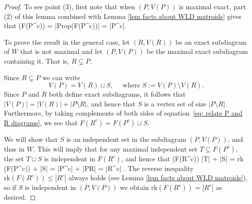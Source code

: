 \documentclass[11pt]{article}
\newcommand{\rk}{\textrm{rk} }
\def\ba #1\ea{\begin{align} #1 \end{align}}
\def\bas #1\eas{\begin{align*} #1 \end{align*}}
\newcommand{\cP}{\mathcal{P}}
\newcommand{\Prop}{\textrm{Prop}}
\theoremstyle{remark}
\theoremstyle{definition}
\begin{document}
\begin{proof}
%

To see point (3), first note that when $(P,V(P))$ is maximal exact, part (2) of this lemma combined with Lemma \ref{lem facts about WLD matroids} gives that
\bas\rk(F(P^c)) = |\Prop(F(P^c))| = |P^c|.\eas

To prove the result in the general case, let $(R,V(R))$ be an exact subdiagram of $W$ that is not maximal and let $(P, V(P))$ be the maximal exact subdiagram containing it. That is, $R \subsetneq P$.

Since $R \subsetneq P$ we can write 
\begin{equation}\label{eq: relate P and R diagrams}V(P) = V(R) \sqcup S, \quad \text{ where } S := V(P) \setminus V(R).\end{equation}
Since $P$ and $R$ both define exact subdiagrams, it follows that $|V(P)| = |V(R)| + |P \setminus R|$, and hence that $S$ is a vertex set of size $|P \setminus R|$. Furthermore, by taking complements of both sides of equation~\eqref{eq: relate P and R diagrams}, we see that $F(R^c) = F(P^c) \sqcup S$. 

We will show that $S$ is an independent set in the subdiagram $(P, V(P))$, and thus in $W$. This will imply that for any maximal independent set $T \subseteq F(P^c)$, the set $T \sqcup S$ is independent in $F(R^c)$, and hence that 
\bas \rk (F(R^c)) \geq |T| + |S| = \rk (F(P^c)) + |S| = |P^c| + |P\setminus R| = |R^c|  \;.\eas 
The reverse inequality $\rk (F(R^c)) \leq |R^c|$ always holds (see Lemma \ref{lem facts about WLD matroids}), so if $S$ is independent in $(P,V(P))$ we obtain $\rk (F(R^c)) = |R^c|$ as desired.


\end{proof}
\end{document}
